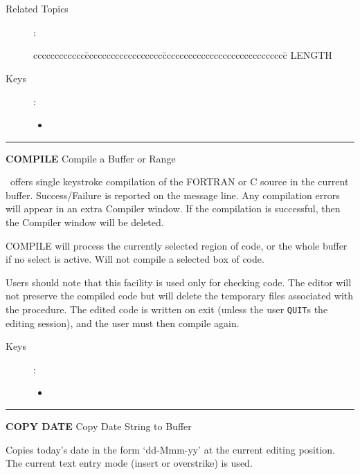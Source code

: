 \begin{description}
\item[Related Topics]:
\begin{tabbing}
cccccccccccc\=cccccccccccccccccc\=ccccccccccccccccccccccccccccc\=\kill
 \> LENGTH \\
\end{tabbing}

\item[Keys]:
           \begin{itemize}
           \item \gold\ 
           \end{itemize}
\end{description}

\goodbreak

\rule{\textwidth}{0.3mm}

{\Large {\bf COMPILE} \hfill Compile a Buffer or Range}

\medskip
  \STEve\ offers single keystroke compilation of the FORTRAN or C source
  in the current buffer. Success/Failure is reported on the message
  line. Any compilation errors will appear in an extra Compiler
  window. If the compilation is successful, then the Compiler
  window will be deleted.

  COMPILE will process the currently selected region of code, or the
  whole buffer if no select is active. Will not compile a selected box
  of code.

  Users should note that this facility is used only for checking code. The
  editor will not preserve the compiled code but will delete the temporary
  files associated with the procedure. The edited code is written
  on exit (unless the user {\tt QUIT}s the editing session), and the user 
  must then compile again.

\begin{description}
\item[Keys]:
          \begin{itemize}
          \item {}\ 
          \end{itemize}
\end{description}

\goodbreak

\rule{\textwidth}{0.3mm}

{\Large {\bf COPY DATE} \hfill Copy Date String to Buffer}

\medskip
  Copies today's date in the form `dd-Mmm-yy' at the current editing
  position. The current text entry mode (insert or overstrike) is used.

